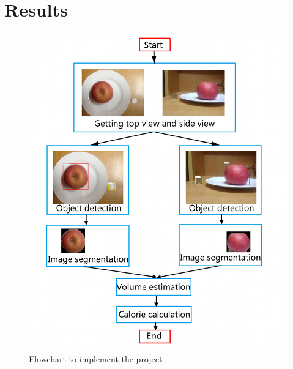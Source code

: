 \documentclass[12pt, a4paper, twoside]{article}
\begin{document}
	\section{Results}
	\lipsum
	\begin{figure}[p]
		\centering
		\includegraphics[width=\textwidth]{roadmap}
		\caption{Flowchart to implement the project\cite{liang}}
		\label{F:roadmap}
	\end{figure}
	
	\printbibliography
\end{document}
